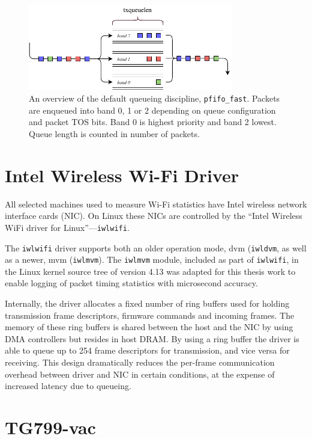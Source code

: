 \begin{figure}
\center
\includegraphics[width=0.8\textwidth]{images/pfifo-fast-queue.pdf}
\caption{An overview of the default queueing discipline, \texttt{pfifo\_fast}. Packets are enqueued into band 0, 1 or 2 depending on queue configuration and packet TOS bits. Band 0 is highest priority and band 2 lowest. Queue length is counted in number of packets.}
\label{fig:pfifofast}
\end{figure}

\section{Intel Wireless Wi-Fi Driver}

All selected machines used to measure Wi-Fi statistics have Intel wireless
network interface cards (NIC). On Linux these NICs are controlled by the ``Intel
Wireless WiFi driver for Linux''—\texttt{iwlwifi}.

The \texttt{iwlwifi} driver supports both an older operation mode, dvm
(\texttt{iwldvm}, as well as a newer, mvm (\texttt{iwlmvm}). The
\texttt{iwlmvm} module, included as part of \texttt{iwlwifi}, in the Linux
kernel source tree of version 4.13 was adapted for this thesis work to enable logging of packet timing statistics with microsecond accuracy.

Internally, the driver allocates a fixed number of ring buffers used for
holding transmission frame descriptors, firmware commands and incoming frames.
The memory of these ring buffers is shared between the host and the NIC by
using DMA controllers but resides in host DRAM. By using a ring buffer the
driver is able to queue up to 254 frame descriptors for transmission, and vice
versa for receiving. This design dramatically reduces the per-frame
communication overhead between driver and NIC in certain conditions, at the
expense of increased latency due to queueing.

\section{TG799-vac}

